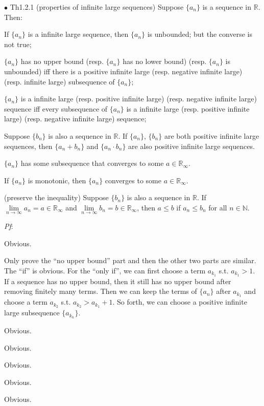 \documentclass{article}
\begin{document}
\begin{Th}{$\bullet$ Th1.2.1 (properties of infinite large sequences)}
    Suppose $\{a_n\}$ is a sequence in $\mathbb{R}$. Then:
    \begin{compactenum}
        \item If $\{a_n\}$ is a infinite large sequence, then $\{a_n\}$ is unbounded; but the converse is not true;
        \item $\{a_n\}$ has no upper bound (resp. $\{a_n\}$ has no lower bound) (resp. $\{a_n\}$ is unbounded) iff there is a positive infinite large (resp. negative infinite large) (resp. infinite large) subsequence of $\{a_n\}$;
        \item $\{a_n\}$ is a infinite large (resp. positive infinite large) (resp. negative infinite large) sequence iff every subsequence of $\{a_n\}$ is a infinite large (resp. positive infinite large) (resp. negative infinite large) sequence;
        \item Suppose $\{b_n\}$ is also a sequence in $\mathbb{R}$. If $\{a_n\}$, $\{b_n\}$ are both positive infinite large sequences, then $\{a_n+b_n\}$ and $\{a_n\cdot b_n\}$ are also positive infinite large sequences.
        \item $\{a_n\}$ has some subsequence that converges to some $a\in\mathbb{R}_\infty$.
        \item If $\{a_n\}$ is monotonic, then $\{a_n\}$ converges to some $a\in\mathbb{R}_\infty$.
        \item (preserve the inequality) Suppose $\{b_n\}$ is also a sequence in $\mathbb{R}$. If $\lim\limits_{n\to\infty}a_n=a\in\mathbb{R}_\infty$ and $\lim\limits_{n\to\infty}b_n=b\in\mathbb{R}_\infty$, then $a\leq b$ if $a_n\leq b_n$ for all $n\in\mathbb{N}$.
    \end{compactenum}
    \tcblower
    \textit{Pf}: 
    \begin{compactenum}
        \item Obvious.
        \item Only prove the ``no upper bound'' part and then the other two parts are similar. The ``if'' is obvious. For the ``only if'', we can first choose a term $a_{k_1}$ s.t. $a_{k_1}>1$. If a sequence has no upper bound, then it still has no upper bound after removing finitely many terms. Then we can keep the terms of $\{a_n\}$ after $a_{k_1}$ and choose a term $a_{k_2}$ s.t. $a_{k_2}>a_{k_1}+1$. So forth, we can choose a positive infinite large subsequence $\{a_{k_n}\}$.
        \item Obvious.
        \item Obvious.
        \item Obvious.
        \item Obvious.
        \item Obvious.
    \end{compactenum}
\end{Th}
\end{document}
